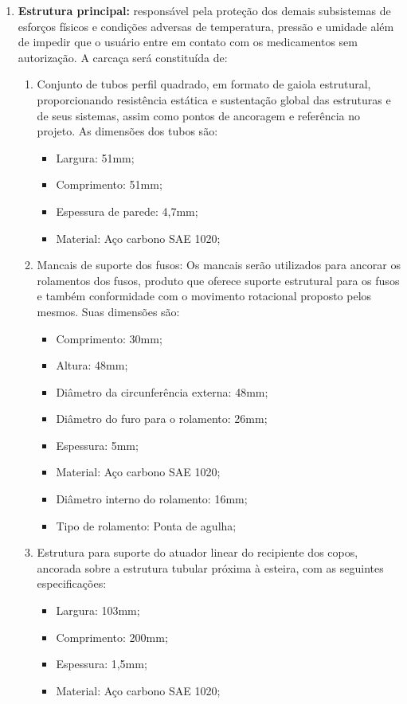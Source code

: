 \begin{enumerate}
\item \textbf{Estrutura principal:}
responsável pela proteção dos demais subsistemas de esforços físicos e condições adversas de temperatura, pressão e umidade além de impedir que o usuário entre em contato com os medicamentos sem autorização. A carcaça será constituída de:
\begin{enumerate}
    \item Conjunto de tubos perfil quadrado, em formato de gaiola estrutural, proporcionando resistência estática e sustentação global das estruturas e de seus sistemas, assim como pontos de ancoragem e referência no projeto. As dimensões dos tubos são:
    \begin{itemize}
        \item Largura: 51mm;
        \item Comprimento: 51mm;
        \item Espessura de parede: 4,7mm;
        \item Material: Aço carbono SAE 1020;
    \end{itemize}
    
    \item Mancais de suporte dos fusos: Os mancais serão utilizados para ancorar os rolamentos dos fusos, produto que oferece suporte estrutural para os fusos e também conformidade com o movimento rotacional proposto pelos mesmos. Suas dimensões são:
    \begin{itemize}
        \item Comprimento: 30mm;
        \item Altura: 48mm;
        \item Diâmetro da circunferência externa: 48mm;
        \item Diâmetro do furo para o rolamento: 26mm;
        \item Espessura: 5mm;
        \item Material: Aço carbono SAE 1020;
        \item Diâmetro interno do rolamento: 16mm;
        \item Tipo de rolamento: Ponta de agulha;
    \end{itemize}
    
    \item Estrutura para suporte do atuador linear do recipiente dos copos, ancorada sobre a estrutura tubular próxima à esteira, com as seguintes especificações:
    \begin{itemize} 
        \item Largura: 103mm;
        \item Comprimento: 200mm;
        \item Espessura: 1,5mm;
        \item Material: Aço carbono SAE 1020;
    \end{itemize}
    

\end{enumerate}
\end{enumerate}
